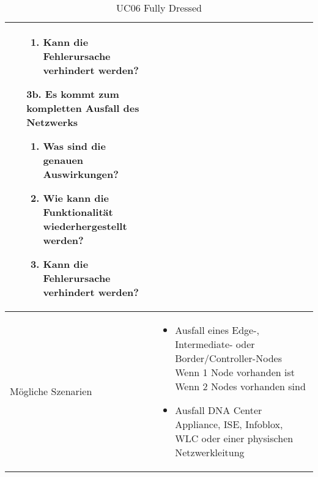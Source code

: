 \begin{table}[H]
\begin{tabularx}{\textwidth}{l | X}
\begin{itemize}
\begin{enumerate}
				\item Kann die Fehlerursache verhindert werden?
			\end{enumerate}
			\item[3b.]  Es kommt zum kompletten Ausfall des Netzwerks
			\begin{enumerate}
				\item Was sind die genauen Auswirkungen?
				\item Wie kann die Funktionalität wiederhergestellt werden?
				\item Kann die Fehlerursache verhindert werden?
			\end{enumerate}
		\end{itemize}
		\\
		\hline
		Mögliche Szenarien  & 
		\begin{itemize}
			\item Ausfall eines Edge-, Intermediate- oder Border/Controller-Nodes
			\subitem Wenn 1 Node vorhanden ist
			\subitem Wenn 2 Nodes vorhanden sind
			\item Ausfall DNA Center Appliance, ISE, Infoblox, WLC oder einer physischen Netzwerkleitung
		\end{itemize}
	\end{tabularx}
	\caption{UC06 Fully Dressed}
	\label{tab:UC06}
\end{table}

